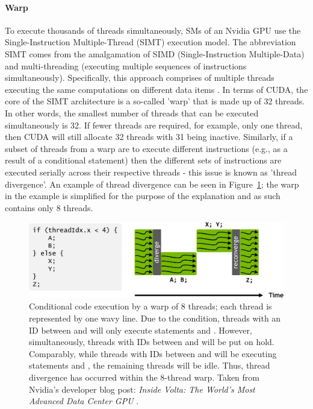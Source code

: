 \paragraph{Warp}\label{Paragraph:theory-CUDA-thread-management-warp}
To execute thousands of threads simultaneously, SMs of an Nvidia GPU use the Single-Instruction Multiple-Thread (SIMT) execution model. The abbreviation SIMT comes from the amalgamation of SIMD (Single-Instruction Multiple-Data) and multi-threading (executing multiple sequences of instructions simultaneously). Specifically, this approach comprises of multiple threads executing the same computations on different data items \cite{Marziale2010}. In terms of CUDA, the core of the SIMT architecture is a so-called 'warp' that is made up of 32 threads. In other words, the smallest number of threads that can be executed simultaneously is 32. If fewer threads are required, for example, only one thread, then CUDA will still allocate 32 threads with 31 being inactive. Similarly, if a subset of threads from a warp are to execute different instructions (e.g., as a result of a conditional statement) then the different sets of instructions are executed serially across their respective threads - this issue is known as 'thread divergence'. An example of thread divergence can be seen in Figure~\ref{Figure:theory-CUDA-warp-thread-divergence}; the warp in the example is simplified for the purpose of the explanation and as such contains only 8 threads.

\begin{figure}[ht!]
	\centering
	\includegraphics[width=14cm, keepaspectratio]{images/ch1/CUDA_warp_divergence_execution_path.jpg}
	\caption{Conditional code execution by a warp of 8 threads; each thread is represented by one wavy line. Due to the condition, threads with an ID between  and  will only execute statements  and . However, simultaneously, threads with IDs between  and  will be put on hold. Comparably, while threads with IDs between  and  will be executing statements  and , the remaining threads will be idle. Thus, thread divergence has occurred within the 8-thread warp. Taken from Nvidia's developer blog post: \emph{Inside Volta: The World's Most Advanced Data Center GPU} \cite{Durant10May2017}.}
	\label{Figure:theory-CUDA-warp-thread-divergence}
\end{figure}

